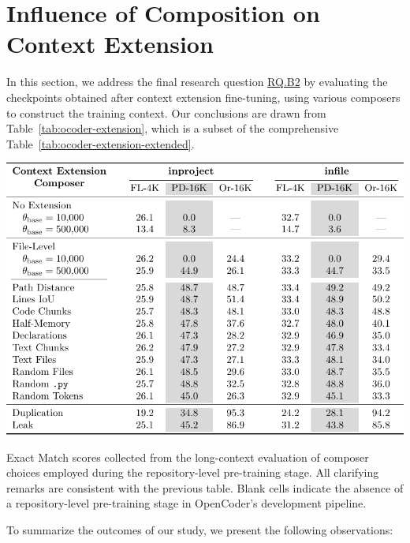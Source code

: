 \section{Influence of Composition on Context Extension}\label{sec:influence-of-composition-on-context-extension}

In this section, we address the final research question \hyperref[rq:rq-b2]{RQ.B2} by evaluating the checkpoints obtained after context extension fine-tuning, using various composers to construct the training context. Our conclusions are drawn from Table~\ref{tab:ocoder-extension}, which is a subset of the comprehensive Table~\ref{tab:ocoder-extension-extended}.

\begin{table}[htbp]
    \centering
    \includegraphics[width=\textwidth]{tables/rq-b2.pdf}
    \caption{Exact Match scores collected from the long-context evaluation of composer choices employed during the repository-level pre-training stage. All clarifying remarks are consistent with the previous table. Blank cells indicate the absence of a repository-level pre-training stage in OpenCoder's development pipeline.}\label{tab:ocoder-extension}
\end{table}

To summarize the outcomes of our study, we present the following observations:

